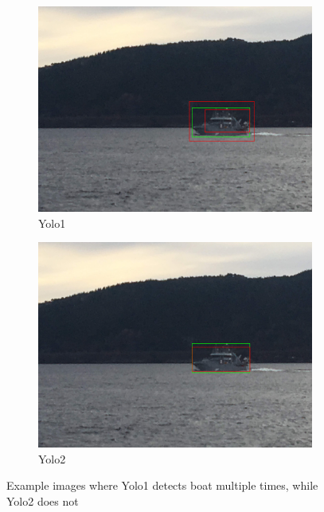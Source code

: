\begin{figure}[h!]
\begin{subfigure}{.5\textwidth}
  \centering
  \includegraphics[width=0.8\linewidth]{results/case_tr_moor/yolo12/yolo1/2better/IMG_2269.jpg}
  \caption{Yolo1}
\end{subfigure}%
\begin{subfigure}{.5\textwidth}
  \centering
  \includegraphics[width=.8\linewidth]{results/case_tr_moor/yolo12/yolo2/2better/IMG_2269.jpg}
  \caption{Yolo2}
\end{subfigure}
\caption{Example images where Yolo1 detects boat multiple times, while Yolo2 does not}
\label{img:yolo1_multi_detect}
\end{figure}
